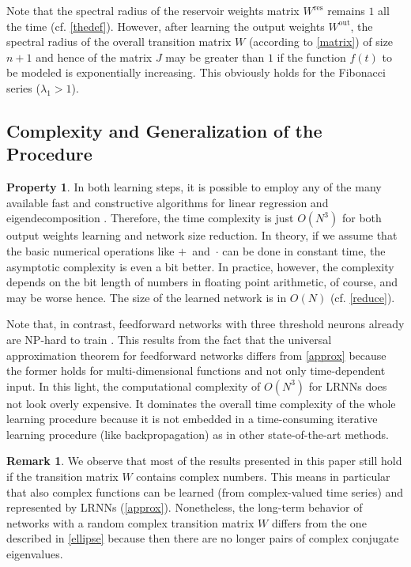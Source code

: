 \documentclass[twoside,11pt]{article}
\theoremstyle{definition}
\newtheorem{prop}{Property}
\newtheorem{remk}{Remark}
\begin{document}
Note that the spectral radius of the reservoir weights matrix $W^\mathrm{res}$
remains $1$ all the time (cf. \cref{thedef}). However, after learning the output
weights $W^\mathrm{out}$, the spectral radius of the overall transition matrix
$W$ (according to \cref{matrix}) of size $n+1$ and hence of the matrix $J$ may
be greater than $1$ if the function $f(t)$ to be modeled is exponentially
increasing. This obviously holds for the Fibonacci series ($\lambda_1>1$).

\subsection{Complexity and Generalization of the Procedure}

\begin{prop}\label{complexity}
In both learning steps, it is possible to employ any of the many available fast
and constructive algorithms for linear regression and eigendecomposition
\citep{DDH07}. Therefore, the time complexity is just $O(N^3)$ for both output
weights learning and network size reduction. In theory, if we assume that
the basic numerical operations like $+$~and~$\cdot$ can be done in constant
time, the asymptotic complexity is even a bit better. In practice, however, the
complexity depends on the bit length of numbers in floating point arithmetic,
of course, and may be worse hence. The size of the learned network is in $O(N)$
(cf. \cref{reduce}).
\end{prop}

Note that, in contrast, feedforward networks with three threshold neurons
already are NP-hard to train \citep{BR92}. This results from the fact
that the universal approximation theorem for feedforward networks differs from
\cref{approx} because the former holds for multi-dimensional functions and
not only time-dependent input. In this light, the computational complexity of
$O(N^3)$ for LRNNs does not look overly expensive. It dominates the
overall time complexity of the whole learning procedure because it is not
embedded in a time-consuming iterative learning procedure (like backpropagation)
as in other state-of-the-art methods.

\begin{remk}
We observe that most of the results presented in this paper still
hold if the transition matrix $W$ contains complex numbers. This means in
particular that also complex functions can be learned (from complex-valued time
series) and represented by LRNNs (\cref{approx}).
Nonetheless, the long-term behavior of networks with a random complex transition
matrix $W$ differs from the one described in \cref{ellipse} because then
there are no longer pairs of complex conjugate eigenvalues.
\end{remk}
\end{document}
